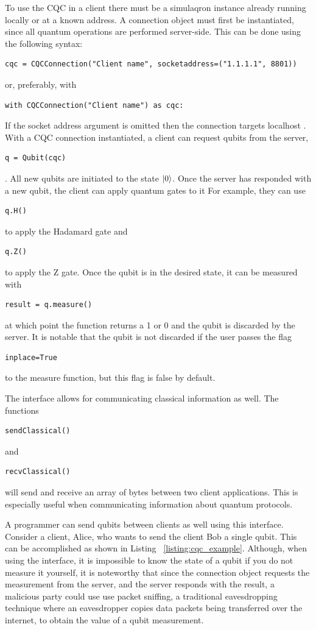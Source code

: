 To use the CQC in a client there must be a simulaqron instance already running locally or at a known address.
A connection object must first be instantiated, since all quantum operations are performed server-side.
This can be done using the following syntax: 
\begin{verbatim}
cqc = CQCConnection("Client name", socketaddress=("1.1.1.1", 8801))
\end{verbatim}
or, preferably, with
\begin{verbatim}
with CQCConnection("Client name") as cqc:
\end{verbatim}
If the socket address argument is omitted then the connection targets localhost \cite{simulaqron}.
With a CQC connection instantiated, a client can request qubits from the server, \begin{verbatim}q = Qubit(cqc)\end{verbatim}.
All new qubits are initiated to the state $\ket{0}$.
Once the server has responded with a new qubit, the client can apply quantum gates to it
For example, they can use \begin{verbatim}q.H()\end{verbatim} 
to apply the Hadamard gate and \begin{verbatim}q.Z()\end{verbatim}
 to apply the Z gate. 
Once the qubit is in the desired state, it can be measured with \begin{verbatim}result = q.measure()\end{verbatim} at which point the function returns a 1 or 0 and the qubit is discarded by the server.
It is notable that the qubit is not discarded if the user passes the flag \begin{verbatim}inplace=True\end{verbatim}
 to the measure function, but this flag is false by default.

The interface allows for communicating classical information as well.
The functions \begin{verbatim}sendClassical()\end{verbatim}
 and 
 \begin{verbatim}recvClassical()\end{verbatim}
  will send and receive an array of bytes between two client applications. This is especially useful when communicating information about quantum protocols.

A programmer can send qubits between clients as well using this interface.
Consider a client, Alice, who wants to send the client Bob a single qubit.
This can be accomplished as shown in Listing ~\ref{listing:cqc_example}.
Although, when using the interface, it is impossible to know the state of a qubit if you do not measure it yourself, it is noteworthy that since the connection object requests the measurement from the server, and the server responds with the result, a malicious party could use use packet sniffing, a traditional eavesdropping technique where an eavesdropper copies data packets being transferred over the internet, to obtain the value of a qubit measurement.


